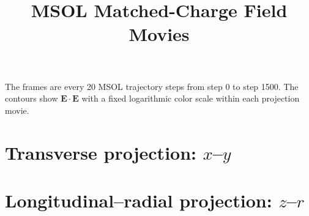 \documentclass[11pt]{article}
\title{MSOL Matched-Charge Field Movies}
\author{}
\date{}
\begin{document}
\maketitle

The frames are every 20 MSOL trajectory steps from step 0 to step 1500.
The contours show $\mathbf{E}\cdot\mathbf{E}$ with a fixed logarithmic color
scale within each projection movie.

\section*{Transverse projection: $x$--$y$}

\begin{center}
\end{center}

\section*{Longitudinal--radial projection: $z$--$r$}

\begin{center}
\end{center}
\end{document}

